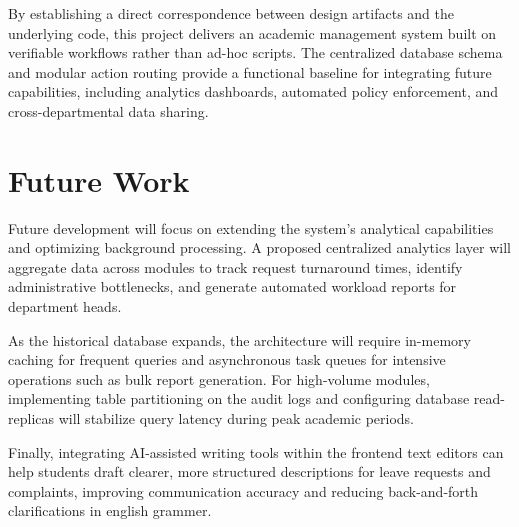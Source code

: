By establishing a direct correspondence between design artifacts and the underlying code, this project delivers an academic management system built on verifiable workflows rather than ad-hoc scripts. The centralized database schema and modular action routing provide a functional baseline for integrating future capabilities, including analytics dashboards, automated policy enforcement, and cross-departmental data sharing.


\section{Future Work}

Future development will focus on extending the system's analytical capabilities and optimizing background processing. A proposed centralized analytics layer will aggregate data across modules to track request turnaround times, identify administrative bottlenecks, and generate automated workload reports for department heads.

As the historical database expands, the architecture will require in-memory caching for frequent queries and asynchronous task queues for intensive operations such as bulk report generation. For high-volume modules, implementing table partitioning on the audit logs and configuring database read-replicas will stabilize query latency during peak academic periods.

Finally, integrating AI-assisted writing tools within the frontend text editors can help students draft clearer, more structured descriptions for leave requests and complaints, improving communication accuracy and reducing back-and-forth clarifications in english grammer.